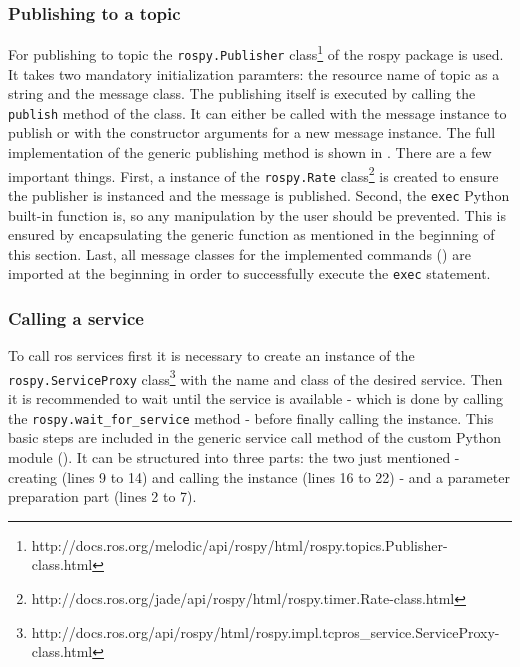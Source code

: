 \subsubsection{Publishing to a topic}
For publishing to topic the \lstinline!rospy.Publisher! class\footnote{http://docs.ros.org/melodic/api/rospy/html/rospy.topics.Publisher-class.html} of the rospy package is used. It takes two mandatory initialization paramters: the resource name of topic as a string and the message class. The publishing itself is executed by calling the \lstinline!publish! method of the class. It can either be called with the message instance to publish or with the constructor arguments for a new message instance. The full implementation of the generic publishing method is shown in . There are a few important things. First, a instance of the \lstinline!rospy.Rate! class\footnote{http://docs.ros.org/jade/api/rospy/html/rospy.timer.Rate-class.html} is created to ensure the publisher is instanced and the message is published. Second, the \lstinline!exec! Python built-in function is, so any manipulation by the user should be prevented. This is ensured by encapsulating the generic function as mentioned in the beginning of this section. Last, all message classes for the implemented commands () are imported at the beginning in order to successfully execute the \lstinline!exec! statement.

\begin{figure}[htbp]
	
\end{figure}

\subsubsection{Calling a service}
To call \gls{ros} services first it is necessary to create an instance of the \lstinline!rospy.ServiceProxy! class\footnote{http://docs.ros.org/api/rospy/html/rospy.impl.tcpros\_service.ServiceProxy-class.html} with the name and class of the desired service. Then it is recommended to wait until the service is available - which is done by calling the \lstinline!rospy.wait_for_service! method - before finally calling the instance. This basic steps are included in the generic service call method of the custom Python module (). It can be structured into three parts: the two just mentioned - creating (lines 9 to 14) and calling the instance (lines 16 to 22) - and a parameter preparation part (lines 2 to 7).

